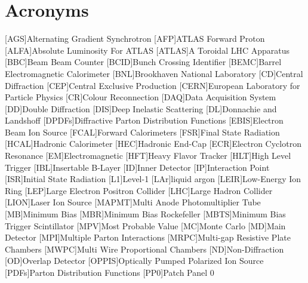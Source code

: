 \chapter{Acronyms}\label{chapter:acronyms}

\begin{acronym}[BRAHMS]
	[AGS]{Alternating Gradient Synchrotron}
	[AFP]{ATLAS Forward Proton}
	[ALFA]{Absolute Luminosity For ATLAS}
	[ATLAS]{A Toroidal LHC Apparatus}
	[BBC]{Beam Beam Counter}
	[BCID]{Bunch Crossing Identifier}
	[BEMC]{Barrel Electromagnetic Calorimeter}
	[BNL]{Brookhaven National Laboratory}
	[CD]{Central Diffraction}
	[CEP]{Central Exclusive Production}
	[CERN]{European Laboratory for Particle Physics }
	[CR]{Colour Reconnection}
	[DAQ]{Data Acquisition System}
	[DD]{Double Diffraction}
	[DIS]{Deep Inelastic Scattering}
	[DL]{Donnachie and Landshoff}
	[DPDFs]{Diffractive Parton
	Distribution Functions}
	[EBIS]{Electron Beam Ion Source}
	[FCAL]{Forward Calorimeters}
	[FSR]{Final State Radiation}
	[HCAL]{Hadronic Calorimeter}
	[HEC]{Hadronic End-Cap}
	[ECR]{Electron Cyclotron Resonance}
	[EM]{Electromagnetic}
	[HFT]{Heavy Flavor Tracker}
	[HLT]{High Level Trigger}
	[IBL]{Insertable B-Layer}
	[ID]{Inner Detector}
	[IP]{Interaction Point}
	[ISR]{Initial State Radiation}
	[L1]{Level-1}
	[LAr]{liquid argon}
	[LEIR]{Low-Energy Ion Ring}
	[LEP]{Large Electron Positron Collider}
	[LHC]{Large Hadron Collider}
	[LION]{Laser Ion Source}
	[MAPMT]{Multi Anode Photomultiplier Tube}
	[MB]{Minimum Bias}
	[MBR]{Minimum Bias Rockefeller}
	[MBTS]{Minimum Bias Trigger Scintillator}
	[MPV]{Most Probable Value}
	[MC]{Monte Carlo}
	[MD]{Main Detector}
	[MPI]{Multiple Parton Interactions}
	[MRPC]{Multi-gap
		Resistive Plate Chambers}
	[MWPC]{Multi Wire Proportional Chambers}
	[ND]{Non-Diffraction}
	[OD]{Overlap Detector}
	[OPPIS]{Optically Pumped Polarized Ion Source}
	[PDFs]{Parton Distribution Functions}
	[PP0]{Patch Panel 0}

\end{acronym}
